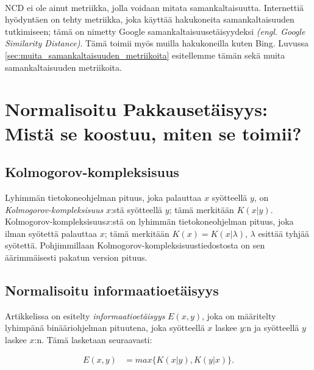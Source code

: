 \documentclass[12pt,finnish,draft,twoside]{tktltiki2}
\theoremstyle{definition}
\theoremstyle{remark}
\newcommand{\engl}[1]{\emph{(engl. #1)}}
\newcommand{\kolmogorov}{Kolmogorov-kompleksisuus}
\begin{document}

\paragraph{} %
\label{par:intro-5}
  NCD ei ole ainut metriikka, jolla voidaan mitata samankaltaisuutta. Internettiä hyödyntäen on tehty metriikka, joka käyttää hakukoneita samankaltaisuuden tutkimiseen; tämä on nimetty Google samankaltaisuusetäisyydeksi \engl{Google Similarity Distance}. Tämä toimii myös muilla hakukoneilla kuten Bing. Luvussa \ref{sec:muita_samankaltaisuuden_metriikoita} esitellemme tämän sekä muita samankaltaisuuden metriikoita.

\pagebreak


\section{Normalisoitu Pakkausetäisyys: Mistä se koostuu, miten se toimii?} %
\label{sec:normalisoitu_pakkauset_isyys}
  \subsection{\kolmogorov} %
\label{sub:kolmogorov_kompleksisuus}

  Lyhimmän tietokoneohjelman pituus, joka palauttaa $x$ syötteellä $y$, on \emph{\kolmogorov} $x$:stä syötteellä $y$; tämä merkitään $K(x|y)$. \kolmogorov $x$:stä on lyhimmän tietokoneohjelman pituus, joka ilman syötettä palauttaa $x$; tämä merkitään $K(x)=K(x|\lambda)$, $\lambda$ esittää tyhjää syötettä. Pohjimmillaan \kolmogorov tiedostosta on sen äärimmäisesti pakatun version pituus.

\subsection{Normalisoitu informaatioetäisyys} %
\label{sub:normalisoitu_informaatioet_isyys}

  Artikkelissa \cite{CV05} on esitelty \emph{informaatioetäisyys} $E(x,y)$, joka on määritelty lyhimpänä binääriohjelman pituutena, joka syötteellä $x$ laskee $y$:n ja syötteellä $y$ laskee $x$:n. Tämä lasketaan seuraavasti:

  \begin{align}
    E(x,y) &= max\{K(x|y),K(y|x)\}.
  \end{align}
\end{document}

